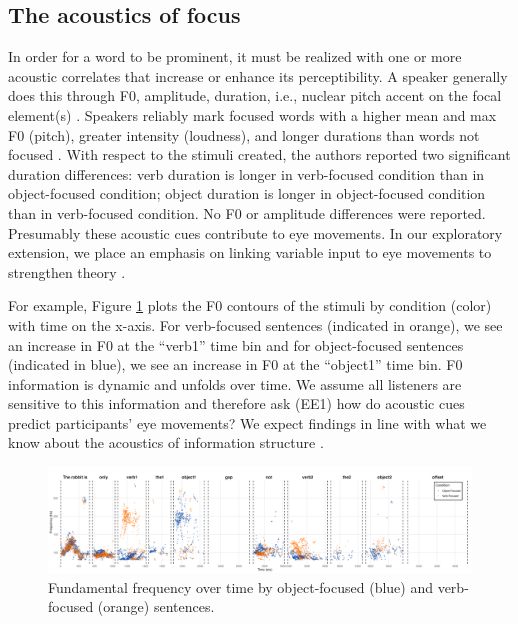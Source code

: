 \subsection{The acoustics of focus}
In order for a word to be prominent, it must be realized with one or more acoustic correlates that increase or enhance its perceptibility. A speaker generally does this through F0, amplitude, duration, i.e., nuclear pitch accent on the focal element(s) \parencite{Gussenhoven1983}. Speakers reliably mark focused words with a higher mean and max F0 (pitch), greater intensity (loudness), and longer durations than words not focused \parencite{Breen2010}.
With respect to the stimuli \textcite{ge2021a} created, the authors reported two significant duration differences: verb duration is longer in verb-focused condition than in object-focused condition; object duration is longer in object-focused condition than in verb-focused condition. No F0 or amplitude differences were reported. Presumably these acoustic cues contribute to eye movements. In our exploratory extension, we place an emphasis on linking variable input to eye movements to strengthen theory \parencite{magnuson2019fixations}. 

For example, Figure \ref{fig:acoustic} plots the F0 contours of the stimuli by condition (color) with time on the x-axis. For verb-focused sentences (indicated in orange), we see an increase in F0 at the “verb1” time bin and for object-focused sentences (indicated in blue), we see an increase in F0 at the “object1” time bin. F0 information is dynamic and unfolds over time. We assume all listeners are sensitive to this information and therefore ask (EE1) how do acoustic cues predict  participants' eye movements? We expect findings in line with what we know about the acoustics of information structure \parencite{Breen2010}.

\begin{figure}[H]  %
    \centering
    \includegraphics[width=\textwidth,height=\textheight,keepaspectratio]{viz/accoustic.png}
    \caption{Fundamental frequency over time by object-focused (blue) and verb-focused (orange) sentences.}
    \label{fig:acoustic}
\end{figure}



